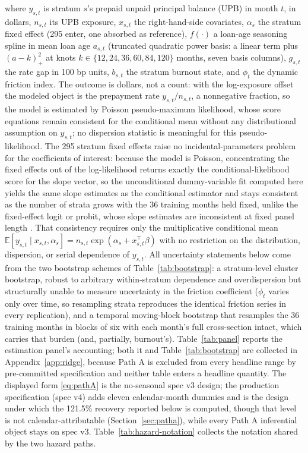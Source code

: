 \documentclass[12pt]{article}
\begin{document}
where $y_{s,t}$ is stratum $s$'s prepaid unpaid principal balance (UPB) in month $t$, in dollars, $n_{s,t}$ its UPB exposure, $x_{s,t}$ the right-hand-side covariates, $\alpha_{s}$ the stratum fixed effect (295 enter, one absorbed as reference), $f(\cdot)$ a loan-age seasoning spline in mean loan age $a_{s,t}$ (truncated quadratic power basis: a linear term plus $(a - k)_+^2$ at knots $k \in \{12, 24, 36, 60, 84, 120\}$ months, seven basis columns), $g_{s,t}$ the rate gap in 100 bp units, $b_{s,t}$ the stratum burnout state, and $\phi_t$ the dynamic friction index. The outcome is dollars, not a count: with the log-exposure offset the modeled object is the prepayment rate $y_{s,t}/n_{s,t}$, a nonnegative fraction, so the model is estimated by Poisson pseudo-maximum likelihood, whose score equations remain consistent for the conditional mean without any distributional assumption on $y_{s,t}$; no dispersion statistic is meaningful for this pseudo-likelihood. The 295 stratum fixed effects raise no incidental-parameters problem for the coefficients of interest: because the model is Poisson, concentrating the fixed effects out of the log-likelihood returns exactly the conditional-likelihood score for the slope vector, so the unconditional dummy-variable fit computed here yields the same slope estimates as the conditional estimator and stays consistent as the number of strata grows with the 36 training months held fixed, unlike the fixed-effect logit or probit, whose slope estimates are inconsistent at fixed panel length \citep{wooldridge1999}. That consistency requires only the multiplicative conditional mean $\mathbb{E}[y_{s,t}\mid x_{s,t},\alpha_{s}] = n_{s,t}\exp(\alpha_{s} + x_{s,t}^{\top}\beta)$ with no restriction on the distribution, dispersion, or serial dependence of $y_{s,t}$. All uncertainty statements below come from the two bootstrap schemes of Table~\ref{tab:bootstrap}: a stratum-level cluster bootstrap, robust to arbitrary within-stratum dependence and overdispersion but structurally unable to measure uncertainty in the friction coefficient ($\phi_t$ varies only over time, so resampling strata reproduces the identical friction series in every replication), and a temporal moving-block bootstrap that resamples the 36 training months in blocks of six with each month's full cross-section intact, which carries that burden (and, partially, burnout's). Table~\ref{tab:panel} reports the estimation panel's accounting; both it and Table~\ref{tab:bootstrap} are collected in Appendix~\ref{app:ridge}, because Path A is excluded from every headline range by pre-committed specification and neither table enters a headline quantity. The displayed form \eqref{eq:pathA} is the no-seasonal spec v3 design; the production specification (spec v4) adds eleven calendar-month dummies and is the design under which the 121.5\% recovery reported below is computed, though that level is not calendar-attributable (Section~\ref{sec:patha}), while every Path A inferential object stays on spec v3. Table~\ref{tab:hazard-notation} collects the notation shared by the two hazard paths.
\end{document}
